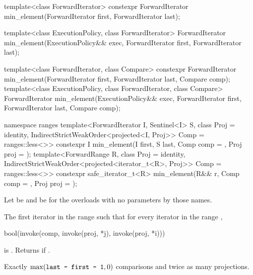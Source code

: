 %
\begin{itemdecl}
template<class ForwardIterator>
  constexpr ForwardIterator min_element(ForwardIterator first, ForwardIterator last);

template<class ExecutionPolicy, class ForwardIterator>
  ForwardIterator min_element(ExecutionPolicy&& exec,
                              ForwardIterator first, ForwardIterator last);

template<class ForwardIterator, class Compare>
  constexpr ForwardIterator min_element(ForwardIterator first, ForwardIterator last,
                                        Compare comp);
template<class ExecutionPolicy, class ForwardIterator, class Compare>
  ForwardIterator min_element(ExecutionPolicy&& exec,
                              ForwardIterator first, ForwardIterator last,
                              Compare comp);

namespace ranges {
  template<ForwardIterator I, Sentinel<I> S, class Proj = identity,
      IndirectStrictWeakOrder<projected<I, Proj>> Comp = ranges::less<>>
    constexpr I min_element(I first, S last, Comp comp = {}, Proj proj = {});
  template<ForwardRange R, class Proj = identity,
      IndirectStrictWeakOrder<projected<iterator_t<R>, Proj>> Comp = ranges::less<>>
    constexpr safe_iterator_t<R>
      min_element(R&& r, Comp comp = {}, Proj proj = {});
}
\end{itemdecl}

\begin{itemdescr}
\pnum
Let  be 
and  be 
for the overloads with no parameters by those names.

\pnum
\returns
The first iterator
in the range
such that for every iterator
in the range
,
\begin{codeblock}
bool(invoke(comp, invoke(proj, *j), invoke(proj, *i)))
\end{codeblock}
is .
Returns
if
.

\pnum
\complexity
Exactly
$\max(\texttt{last - first - 1}, 0)$
comparisons and twice as many projections.
\end{itemdescr}

